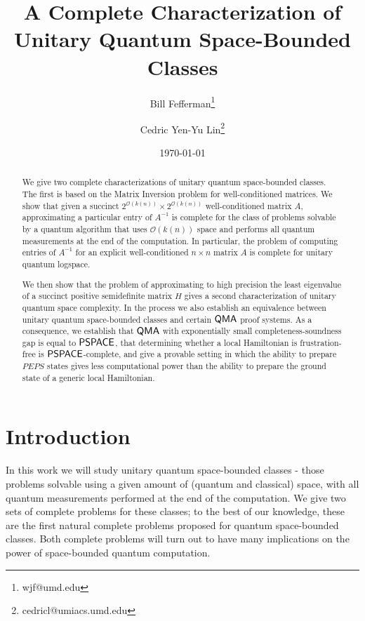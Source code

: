 \documentclass[11pt]{article}
\theoremstyle{definition}
\theoremstyle{remark}
\newcommand\QMA{{\sf{QMA}}}
\newcommand\PSPACE{{\sf{PSPACE}}}
\begin{document}
\title{A Complete Characterization of Unitary Quantum Space-Bounded Classes}
\author[1]{Bill Fefferman\thanks{wjf@umd.edu}}
\author[1]{Cedric Yen-Yu Lin\thanks{cedricl@umiacs.umd.edu}}
\date{\today}
\maketitle
\begin{abstract}
We give two complete characterizations of unitary quantum space-bounded classes.  The first is based on the Matrix Inversion problem for well-conditioned matrices.  We show that given a succinct $2^{\mathcal{O}(k(n))} \times 2^{\mathcal{O}(k(n))}$ well-conditioned matrix $A$, approximating a particular entry of $A^{-1}$ is complete for the class of problems solvable by a quantum algorithm that uses $\mathcal{O}(k(n))$ space and performs all quantum measurements at the end of the computation. In particular, the problem of computing entries of $A^{-1}$ for an explicit well-conditioned $n \times n$ matrix $A$ is complete for unitary quantum logspace.

We then show that the problem of approximating to high precision the least eigenvalue of a succinct positive semidefinite matrix $H$ gives a second characterization of unitary quantum space complexity. In the process we also establish an equivalence between unitary quantum space-bounded classes and certain $\QMA$ proof systems. As a consequence, we establish that $\QMA$ with exponentially small completeness-soundness gap is equal to $\PSPACE$, that determining whether a local Hamiltonian is frustration-free is $\PSPACE$-complete, and give a provable setting in which the ability to prepare $PEPS$ states gives less computational power than the ability to prepare the ground state of a generic local Hamiltonian.
\end{abstract}

\section{Introduction}
In this work we will study unitary quantum space-bounded classes - those problems solvable using a given amount of (quantum and classical) space, with all quantum measurements performed at the end of the computation. We give two sets of complete problems for these classes; to the best of our knowledge, these are the first natural complete problems proposed for quantum space-bounded classes. Both complete problems will turn out to have many implications on the power of space-bounded quantum computation.
\end{document}
